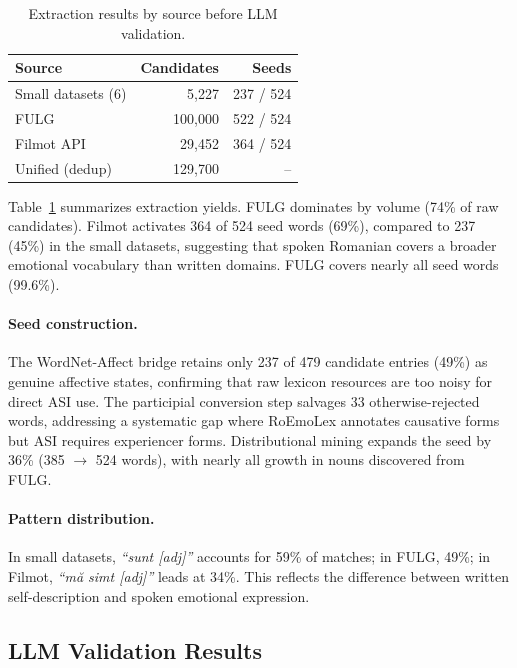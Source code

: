 \documentclass[11pt]{article}
\begin{document}
\begin{table}[t]
    \centering
    \small
    \begin{tabular}{lrr}
        \toprule
        Source & Candidates & Seeds \\
        \midrule
        Small datasets (6) & 5,227 & 237 / 524 \\
        FULG & 100,000 & 522 / 524 \\
        Filmot API & 29,452 & 364 / 524 \\
        \midrule
        Unified (dedup) & 129,700 & -- \\
        \bottomrule
    \end{tabular}
    \caption{Extraction results by source before LLM validation.}
    \label{tab:extraction-results}
\end{table}

Table~\ref{tab:extraction-results} summarizes extraction yields. FULG dominates by volume (74\% of raw candidates). Filmot activates 364 of 524 seed words (69\%), compared to 237 (45\%) in the small datasets, suggesting that spoken Romanian covers a broader emotional vocabulary than written domains. FULG covers nearly all seed words (99.6\%).

\paragraph{Seed construction.} The WordNet-Affect bridge retains only 237 of 479 candidate entries (49\%) as genuine affective states, confirming that raw lexicon resources are too noisy for direct ASI use. The participial conversion step salvages 33 otherwise-rejected words, addressing a systematic gap where RoEmoLex annotates causative forms but ASI requires experiencer forms. Distributional mining expands the seed by 36\% (385 $\rightarrow$ 524 words), with nearly all growth in nouns discovered from FULG.

\paragraph{Pattern distribution.} In small datasets, \textit{``sunt [adj]''} accounts for 59\% of matches; in FULG, 49\%; in Filmot, \textit{``m\u{a} simt [adj]''} leads at 34\%. This reflects the difference between written self-description and spoken emotional expression.

\subsection{LLM Validation Results}
\end{document}
